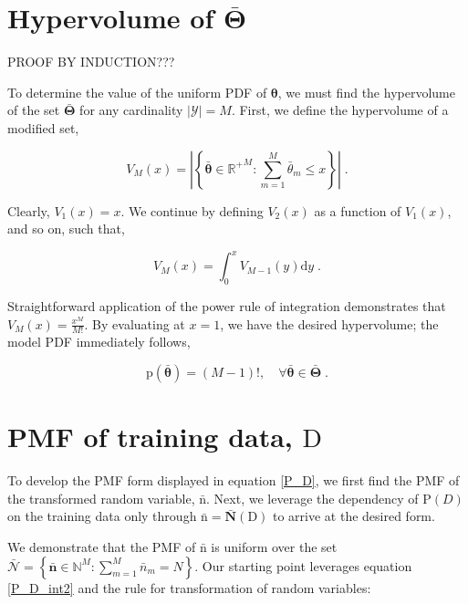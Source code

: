 \documentclass[12pt]{article}
\begin{document}
\newpage

\appendix


\section{Hypervolume of $\bar{\bm{\Theta}}$} \label{app:Theta}

PROOF BY INDUCTION???

To determine the value of the uniform PDF of $\bm{\theta}$, we must find the hypervolume of the set $\bar{\bm{\Theta}}$ for any cardinality $|\mathcal{Y}| = M$. First, we define the hypervolume of a modified set,

\begin{equation}
V_M(x) = \left| \left\{ \bar{\bm{\theta}} \in {\mathbb{R}^+}^{M}: \sum_{m=1}^{M} \bar{\theta}_m \leq x \right\} \right| \;.
\end{equation}

Clearly, $V_1(x) = x$. We continue by defining $V_2(x)$ as a function of $V_1(x)$, and so on, such that,

\begin{equation}
V_M(x) = \int_0^x V_{M-1}(y) \mathrm{d}y \;.
\end{equation}

Straightforward application of the power rule of integration demonstrates that $V_M(x) = \frac{x^M}{M!}$. By evaluating at $x=1$, we have the desired hypervolume; the model PDF immediately follows,

\begin{equation}
\text{p}\left(\bar{\bm{\theta}}\right)= (M-1)!,  \quad \forall \bar{\bm{\theta}} \in \bar{\bm{\Theta}} \;.
\end{equation}




\section{PMF of training data, $\mathrm{D}$} \label{app:P_D}

To develop the PMF form displayed in equation \eqref{P_D}, we first find the PMF of the transformed random variable, $\bar{\bm{\mathrm{n}}}$. Next, we leverage the dependency of $\text{P}(D)$ on the training data only through $\bar{\bm{\mathrm{n}}} = \bar{\bm{N}}(\mathrm{D})$ to arrive at the desired form.

We demonstrate that the PMF of $\bar{\bm{\mathrm{n}}}$ is uniform over the set $\bar{\mathcal{N}} = \left\{ \bar{\bm{n}} \in \mathbb{N}^M: \sum_{m=1}^M \bar{n}_m = N \right\}$. Our starting point leverages equation \eqref{P_D_int2} and the rule for transformation of random variables:
\end{document}
